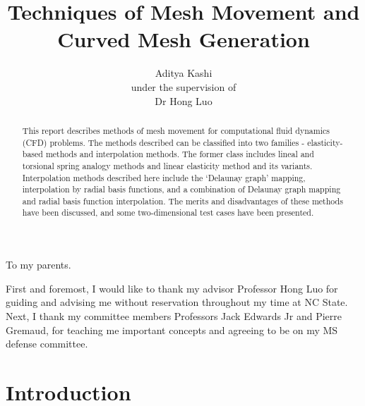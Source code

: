 \documentclass[11pt, ms, onehalfspacing]{ncsuthesis}
\title{Techniques of Mesh Movement and Curved Mesh Generation}
\author{Aditya Kashi \\ {\small under the supervision of} \\ Dr Hong Luo}
\begin{document}
\maketitle

\begin{abstract}
This report describes methods of mesh movement for computational fluid dynamics (CFD) problems. The methods described can be classified into two families - elasticity-based methods and interpolation methods. The former class includes lineal and torsional spring analogy methods and linear elasticity method and its variants. Interpolation methods described here include the `Delaunay graph' mapping, interpolation by radial basis functions, and a combination of Delaunay graph mapping and radial basis function interpolation. The merits and disadvantages of these methods have been discussed, and some two-dimensional test cases have been presented.
\end{abstract}

\makecopyrightpage

\begin{dedication}
	\centering To my parents.
\end{dedication}

\begin{acknowledgements}
	First and foremost, I would like to thank my advisor Professor Hong Luo for guiding and advising me without reservation throughout my time at NC State. Next, I thank my committee members Professors Jack Edwards Jr and Pierre Gremaud, for teaching me important concepts and agreeing to be on my MS defense committee.
\end{acknowledgements}

\thesistableofcontents

\thesislistoftables

\thesislistoffigures

\chapter{Introduction}
\end{document}
